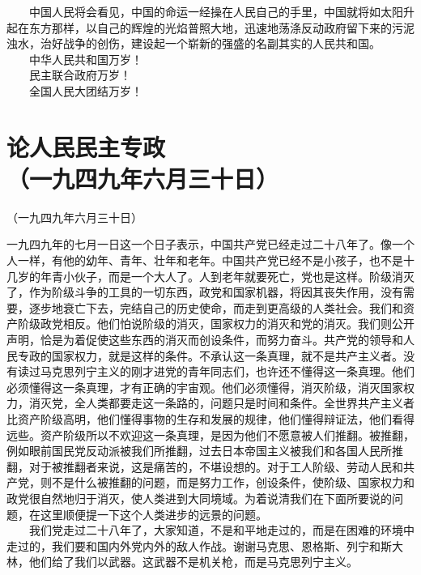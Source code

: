 \documentclass[cn,11pt,chinese]{elegantbook}
\def\myformat#1{\hfil\hfil #1}
\begin{document}
　　中国人民将会看见，中国的命运一经操在人民自己的手里，中国就将如太阳升起在东方那样，以自己的辉煌的光焰普照大地，迅速地荡涤反动政府留下来的污泥浊水，治好战争的创伤，建设起一个崭新的强盛的名副其实的人民共和国。\\
　　中华人民共和国万岁！\\
　　民主联合政府万岁！\\
　　全国人民大团结万岁！\\
\newpage\section*{\myformat{论人民民主专政}\\\myformat{（一九四九年六月三十日）}}
\begin{introduction}\item （一九四九年六月三十日）\end{introduction}
一九四九年的七月一日这一个日子表示，中国共产党已经走过二十八年了。像一个人一样，有他的幼年、青年、壮年和老年。中国共产党已经不是小孩子，也不是十几岁的年青小伙子，而是一个大人了。人到老年就要死亡，党也是这样。阶级消灭了，作为阶级斗争的工具的一切东西，政党和国家机器，将因其丧失作用，没有需要，逐步地衰亡下去，完结自己的历史使命，而走到更高级的人类社会。我们和资产阶级政党相反。他们怕说阶级的消灭，国家权力的消灭和党的消灭。我们则公开声明，恰是为着促使这些东西的消灭而创设条件，而努力奋斗。共产党的领导和人民专政的国家权力，就是这样的条件。不承认这一条真理，就不是共产主义者。没有读过马克思列宁主义的刚才进党的青年同志们，也许还不懂得这一条真理。他们必须懂得这一条真理，才有正确的宇宙观。他们必须懂得，消灭阶级，消灭国家权力，消灭党，全人类都要走这一条路的，问题只是时间和条件。全世界共产主义者比资产阶级高明，他们懂得事物的生存和发展的规律，他们懂得辩证法，他们看得远些。资产阶级所以不欢迎这一条真理，是因为他们不愿意被人们推翻。被推翻，例如眼前国民党反动派被我们所推翻，过去日本帝国主义被我们和各国人民所推翻，对于被推翻者来说，这是痛苦的，不堪设想的。对于工人阶级、劳动人民和共产党，则不是什么被推翻的问题，而是努力工作，创设条件，使阶级、国家权力和政党很自然地归于消灭，使人类进到大同境域。为着说清我们在下面所要说的问题，在这里顺便提一下这个人类进步的远景的问题。\\
　　我们党走过二十八年了，大家知道，不是和平地走过的，而是在困难的环境中走过的，我们要和国内外党内外的敌人作战。谢谢马克思、恩格斯、列宁和斯大林，他们给了我们以武器。这武器不是机关枪，而是马克思列宁主义。\\
\end{document}
